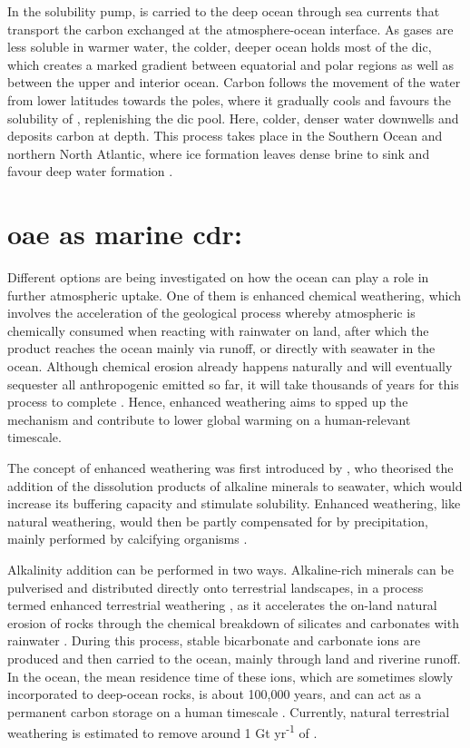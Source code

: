 In the solubility pump,  is carried to the deep ocean through sea currents that transport the carbon exchanged at the atmosphere-ocean interface. As gases are less soluble in warmer water, the colder, deeper ocean holds most of the \ac{dic}, which creates a marked gradient between equatorial and polar regions as well as between the upper and interior ocean. Carbon follows the movement of the water from lower latitudes towards the poles, where it gradually cools and favours the solubility of , replenishing the \ac{dic} pool. Here, colder, denser water downwells and deposits carbon at depth. This process takes place in the Southern Ocean and northern North Atlantic, where ice formation leaves dense brine to sink and favour deep water formation \citep{reid2009impacts}. 

\section[\texorpdfstring{OAE}{OAE} as marine \texorpdfstring{CDR}{CDR}:]{\ac{oae} as marine \ac{cdr}:}

Different options are being investigated on how the ocean can play a role in further atmospheric  uptake. One of them is enhanced chemical weathering, which involves the acceleration of the geological process whereby atmospheric  is chemically consumed when reacting with rainwater on land, after which the product reaches the ocean mainly via runoff, or directly with seawater in the ocean. Although chemical erosion already happens naturally and will eventually sequester all anthropogenic  emitted so far, it will take thousands of years for this process to complete \citep{archer2009atmospheric}. Hence, enhanced weathering aims to spped up the mechanism and contribute to lower global warming on a human-relevant timescale. 

The concept of enhanced weathering was first introduced by \cite{kheshgi1995sequestering}, who theorised the addition of the dissolution products of alkaline minerals to seawater, which would increase its buffering capacity and stimulate  solubility. Enhanced weathering, like natural weathering, would then be partly compensated for by  precipitation, mainly performed by calcifying organisms \citep{NAP26278}. 

Alkalinity addition can be performed in two ways. Alkaline-rich minerals can be pulverised and distributed directly onto terrestrial landscapes, in a process termed enhanced terrestrial weathering \citep{bach2019co2}, as it accelerates the on-land natural erosion of rocks through the chemical breakdown of silicates and carbonates with rainwater \citep{taylor2016enhanced}. During this process, stable bicarbonate and carbonate ions are produced and then carried to the ocean, mainly through land and riverine runoff. In the ocean, the mean residence time of these ions, which are sometimes slowly incorporated to deep-ocean rocks, is about 100,000 years, and can act as a permanent carbon storage on a human timescale \citep{renforth2017assessing}. Currently, natural terrestrial weathering is estimated to remove around 1 Gt yr\textsuperscript{-1} of  \citep{zhang2022river}. 

